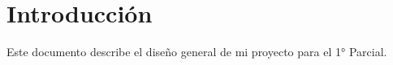 \section{Introducción}

Este documento describe el diseño general de mi proyecto para el 1° Parcial.